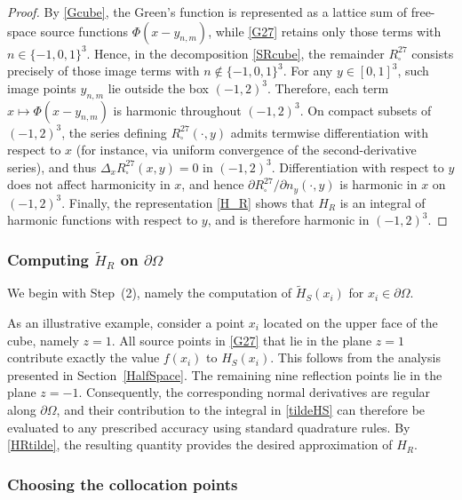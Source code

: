 \documentclass[12pt,oneside,reqno]{amsart}%
\theoremstyle{plain}
\numberwithin{equation}{section}
\begin{document}
\begin{proof}
By \eqref{Gcube}, the Green’s function is represented as a
lattice sum of free-space source functions
$\Phi(x-y_{n,m})$, while \eqref{G27} retains only those
terms with $n\in\{-1,0,1\}^3$.
Hence, in the decomposition \eqref{SRcube}, the remainder
$R_{\square}^{27}$ consists precisely of those image terms
with $n\notin\{-1,0,1\}^3$.
For any $y\in[0,1]^3$, such image points $y_{n,m}$ lie
outside the box $(-1,2)^3$.
Therefore, each term
$x\mapsto\Phi(x-y_{n,m})$ is harmonic throughout
$(-1,2)^3$.
On compact subsets of $(-1,2)^3$, the series defining
$R_{\square}^{27}(\cdot,y)$ admits termwise differentiation
with respect to $x$ (for instance, via uniform convergence
of the second-derivative series),
and thus $\Delta_x R_{\square}^{27}(x,y)=0$
in $(-1,2)^3$.
Differentiation with respect to $y$ does not affect
harmonicity in $x$, and hence
$\partial R_{\square}^{27}/\partial n_y(\cdot,y)$
is harmonic in $x$ on $(-1,2)^3$.
Finally, the representation \eqref{H_R}
shows that $H_R$ is an integral of harmonic functions
with respect to $y$, and is therefore harmonic
in $(-1,2)^3$.
\end{proof}

\subsubsection{Computing $\tilde H_R$ on $\partial\Omega$}\label{HRxi}\hfill

We begin with Step~(2), namely the computation of
$\tilde H_S(x_i)$ for $x_i \in \partial\Omega$.

As an illustrative example, consider a point $x_i$
located on the upper face of the cube, namely $z=1$.
All source points in \eqref{G27} that lie in the plane $z=1$
contribute exactly the value $f(x_i)$ to $H_S(x_i)$.
This follows from the analysis presented in
Section~\ref{HalfSpace}.
The remaining nine reflection points lie in the plane $z=-1$.
Consequently, the corresponding normal derivatives are regular 
along $\partial\Omega$, and their contribution to the integral 
in \eqref{tildeHS} can therefore be evaluated to any prescribed 
accuracy using standard quadrature rules. 
By \eqref{HRtilde}, the resulting quantity provides 
the desired approximation of $H_R$.

\subsubsection{Choosing the collocation points}\hfill
\end{document}
